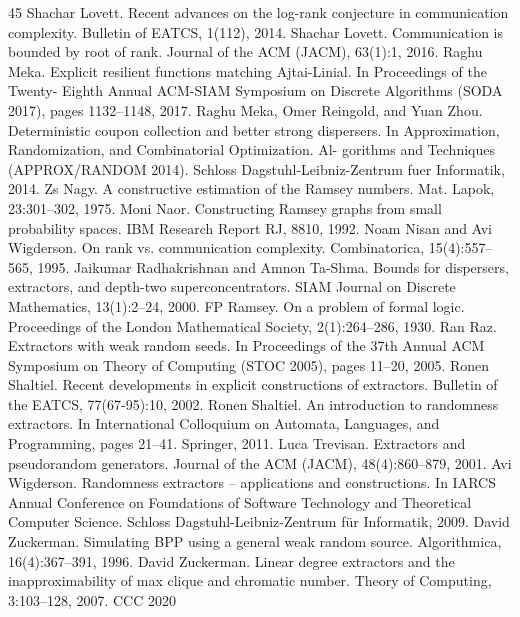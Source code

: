 \documentclass[10pt,a4paper]{article}
\begin{document}
\begin{thebibliography}{45}
 Shachar Lovett. Recent advances on the log-rank conjecture in communication complexity. Bulletin of EATCS, 1(112), 2014.
 Shachar Lovett. Communication is bounded by root of rank. Journal of the ACM (JACM), 63(1):1, 2016.
 Raghu Meka. Explicit resilient functions matching Ajtai-Linial. In Proceedings of the Twenty- Eighth Annual ACM-SIAM Symposium on Discrete Algorithms (SODA 2017), pages 1132–1148, 2017.
 Raghu Meka, Omer Reingold, and Yuan Zhou. Deterministic coupon collection and better strong dispersers. In Approximation, Randomization, and Combinatorial Optimization. Al- gorithms and Techniques (APPROX/RANDOM 2014). Schloss Dagstuhl-Leibniz-Zentrum fuer Informatik, 2014.
 Zs Nagy. A constructive estimation of the Ramsey numbers. Mat. Lapok, 23:301–302, 1975.
 Moni Naor. Constructing Ramsey graphs from small probability spaces. IBM Research Report RJ, 8810, 1992.
 Noam Nisan and Avi Wigderson. On rank vs. communication complexity. Combinatorica, 15(4):557–565, 1995.
 Jaikumar Radhakrishnan and Amnon Ta-Shma. Bounds for dispersers, extractors, and depth-two superconcentrators. SIAM Journal on Discrete Mathematics, 13(1):2–24, 2000.
 FP Ramsey. On a problem of formal logic. Proceedings of the London Mathematical Society, 2(1):264–286, 1930.
 Ran Raz. Extractors with weak random seeds. In Proceedings of the 37th Annual ACM Symposium on Theory of Computing (STOC 2005), pages 11–20, 2005.
 Ronen Shaltiel. Recent developments in explicit constructions of extractors. Bulletin of the EATCS, 77(67-95):10, 2002.
 Ronen Shaltiel. An introduction to randomness extractors. In International Colloquium on Automata, Languages, and Programming, pages 21–41. Springer, 2011.
 Luca Trevisan. Extractors and pseudorandom generators. Journal of the ACM (JACM), 48(4):860–879, 2001.
 Avi Wigderson. Randomness extractors – applications and constructions. In IARCS Annual Conference on Foundations of Software Technology and Theoretical Computer Science. Schloss Dagstuhl-Leibniz-Zentrum für Informatik, 2009.
 David Zuckerman. Simulating BPP using a general weak random source. Algorithmica, 16(4):367–391, 1996.
 David Zuckerman. Linear degree extractors and the inapproximability of max clique and chromatic number. Theory of Computing, 3:103–128, 2007. CCC 2020
\end{thebibliography}
\end{document}
